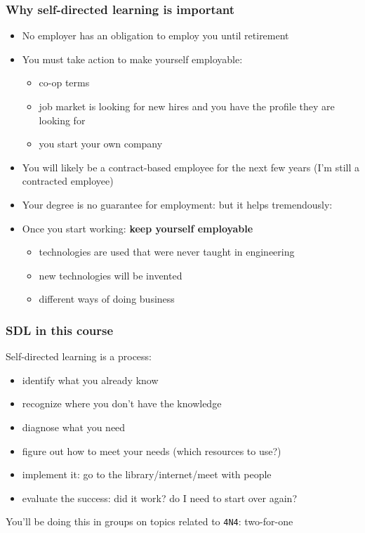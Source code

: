 \begin{frame}\frametitle{Why self-directed learning is important}
	\begin{itemize}
		\item	No employer has an obligation to employ you until retirement
		\item	You must take action to make yourself employable:
		\begin{itemize}
			\item	co-op terms
			\item	job market is looking for new hires and you have the profile they are looking for
			\item	you start your own company
		\end{itemize}
		\pause
		\item	You will likely be a contract-based employee for the next few years (I'm still a contracted employee)
		\item	Your degree is no guarantee for employment: but it helps tremendously: {}
		\pause
		\item	Once you start working: \textbf{keep yourself employable}
		\begin{itemize}
			\item	technologies are used that were never taught in engineering
			\item	new technologies will be invented
			\item	different ways of doing business			
		\end{itemize}
	\end{itemize}
\end{frame}

\begin{frame}\frametitle{SDL in this course}
	Self-directed learning is a process: 
	\begin{itemize}
		\item	identify what you already know
		\item	recognize where you don't have the knowledge
		\item	diagnose what you need
		\item	figure out how to meet your needs (which resources to use?)
		\item	implement it: go to the library/internet/meet with people
		\item	evaluate the success: did it work? do I need to start over again?
	\end{itemize}
	\vspace{12pt}
	You'll be doing this in groups on topics related to \texttt{4N4}: two-for-one
\end{frame}


